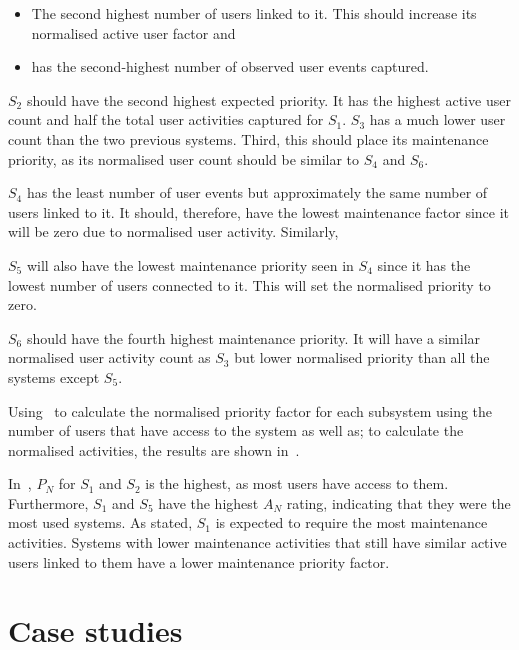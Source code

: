 \begin{itemize}
	\item The second highest number of users linked to it. This should increase its normalised active user factor and
	\item has the second-highest number of observed user events captured.
\end{itemize}

$S_2$ should have the second highest expected priority. It has the highest active user count and half the total user activities captured for $S_1$. $S_3$ has a much lower user count than the two previous systems. Third, this should place its maintenance priority, as its normalised user count should be similar to $S_4$ and $S_6$. \par $S_4$ has the least number of user events but approximately the same number of users linked to it. It should, therefore, have the lowest maintenance factor since it will be zero due to normalised user activity. Similarly, \par $S_5$ will also have the lowest maintenance priority seen in $S_4$ since it has the lowest number of users connected to it. This will set the normalised priority to zero. \par $S_6$ should have the fourth highest maintenance priority. It will have a similar normalised user activity count as $S_3$ but lower normalised priority than all the systems except $S_5$. \par Using~ to calculate the normalised priority factor for each subsystem using the number of users that have access to the system as well as;  to calculate the normalised activities, the results are shown in~.



In~, $P_N$ for $S_1$ and $S_2$ is the highest, as most users have access to them. Furthermore, $S_1$ and $S_5$ have the highest $A_N$ rating, indicating that they were the most used systems. As stated, $S_1$ is expected to require the most maintenance activities. Systems with lower maintenance activities that still have similar active users linked to them have a lower maintenance priority factor.

\clearpage

\section{Case studies}\label{sec:ch3_caseStudies}

